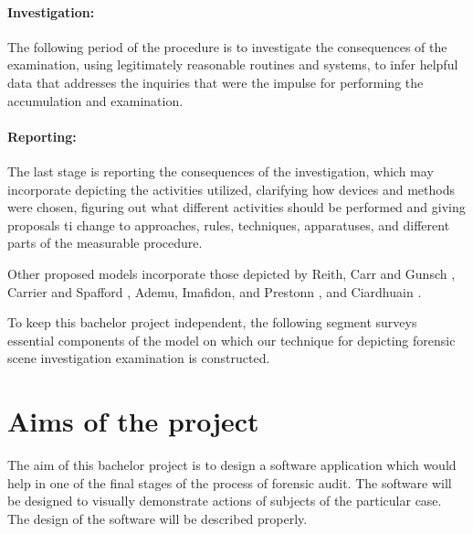\paragraph{Investigation:}
The following period of the procedure is to investigate the consequences of the examination, using legitimately reasonable routines and systems, to infer helpful data that addresses the inquiries that were the impulse for performing the accumulation and examination. 


\paragraph{Reporting:}
The last stage is reporting the consequences of the investigation, which may incorporate depicting the activities utilized, clarifying how devices and methods were chosen, figuring out what different activities should be performed and giving proposals ti change to approaches, rules, techniques, apparatuses, and different parts of the measurable procedure. 

Other proposed models incorporate those depicted by Reith, Carr and Gunsch \cite{5}, Carrier and Spafford \cite{6}, Ademu, Imafidon, and Prestonn \cite{8}, and Ciardhuain \cite{7}.

To keep this bachelor project independent, the following segment surveys essential components of the model on which our technique for depicting forensic scene investigation examination is constructed. 





\section{Aims of the project} %

The aim of this bachelor project is to design a software application which would help in one of the final stages of the process of forensic audit. The software will be designed to visually demonstrate actions of subjects of the particular case. The design of the software will be described properly.


